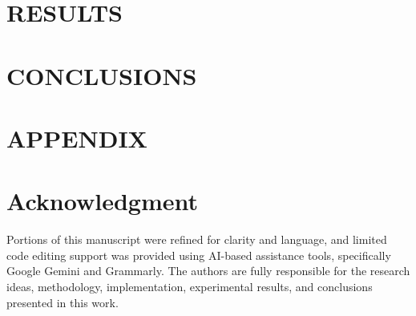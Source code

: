 \documentclass[letterpaper, 10 pt, conference]{ieeeconf}  %
\begin{document}
\section{RESULTS}
\section{CONCLUSIONS}
\section*{APPENDIX}
\section*{Acknowledgment}
Portions of this manuscript were refined for clarity and language, and limited code editing support was provided using AI-based assistance tools, specifically Google Gemini and Grammarly.
The authors are fully responsible for the research ideas, methodology, implementation, experimental results, and conclusions presented in this work.

\end{document}
